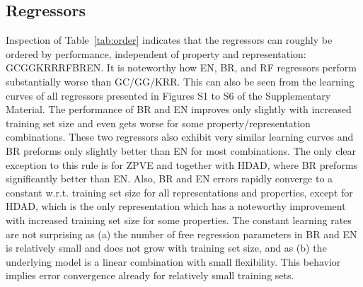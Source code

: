 \documentclass[reprint, superscriptaddress,
amsmath,amssymb, aps, prb,
]{revtex4-1}
\begin{document}
{\subsection{Regressors}



Inspection of Table~\ref{tab:order} indicates that the regressors can roughly be ordered by performance, independent of property and representation: 
GCGGKRRRFBREN.
It is noteworthy how EN, BR, and RF regressors perform substantially worse than GC/GG/KRR. 
This can also be seen from the learning curves of all regressors presented in Figures S1 to S6 of the Supplementary Material.
The performance of BR and EN improves only slightly with increased training set size and even gets worse for some property/representation combinations. 
These two regressors also exhibit very similar learning curves and BR preforms only slightly better than EN for most combinations. 
The only clear exception to this rule is for ZPVE and  together with HDAD, where BR preforms significantly better than EN. 
Also, BR and EN errors rapidly converge to a constant w.r.t. training set size for all representations and properties, except for HDAD, which is the only representation which has a noteworthy improvement with increased training set size for some properties. 
The constant learning rates are not surprising as (a) the number of free regression parameters in BR and EN is relatively small and does not grow with training set size, and as (b) the underlying model is a linear combination with small flexibility. 
This behavior implies error convergence already for relatively small training sets. 



}
\end{document}
